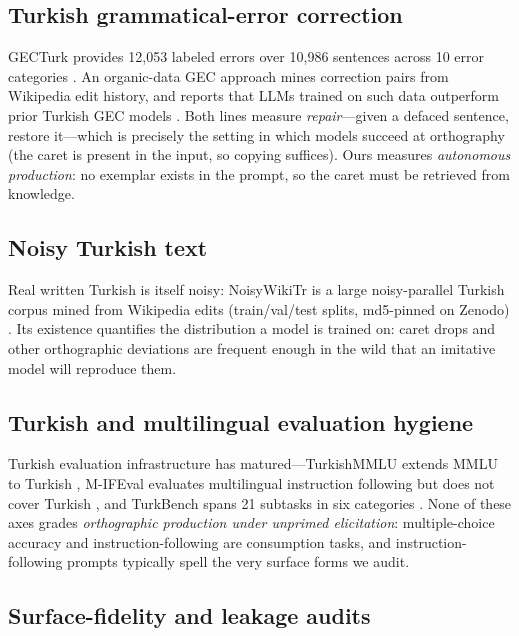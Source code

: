 \documentclass[11pt]{article}
\begin{document}
\subsection{Turkish grammatical-error correction}

GECTurk provides 12{,}053 labeled errors over 10{,}986 sentences across 10 error categories \cite{gecturk2023}. An organic-data GEC approach mines correction pairs from Wikipedia edit history, and reports that LLMs trained on such data outperform prior Turkish GEC models \cite{organicgec2024}. Both lines measure \emph{repair}---given a defaced sentence, restore it---which is precisely the setting in which models succeed at orthography (the caret is present in the input, so copying suffices). Ours measures \emph{autonomous production}: no exemplar exists in the prompt, so the caret must be retrieved from knowledge.

\subsection{Noisy Turkish text}

Real written Turkish is itself noisy: NoisyWikiTr is a large noisy-parallel Turkish corpus mined from Wikipedia edits (train/val/test splits, md5-pinned on Zenodo) \cite{noisywiki2025}. Its existence quantifies the distribution a model is trained on: caret drops and other orthographic deviations are frequent enough in the wild that an imitative model will reproduce them.

\subsection{Turkish and multilingual evaluation hygiene}

Turkish evaluation infrastructure has matured---TurkishMMLU extends MMLU to Turkish \cite{turkishmmlu2024}, M-IFEval evaluates multilingual instruction following but does not cover Turkish \cite{mifeval2025}, and TurkBench spans 21 subtasks in six categories \cite{turkbench2026}. None of these axes grades \emph{orthographic production under unprimed elicitation}: multiple-choice accuracy and instruction-following are consumption tasks, and instruction-following prompts typically spell the very surface forms we audit.

\subsection{Surface-fidelity and leakage audits}
\end{document}
